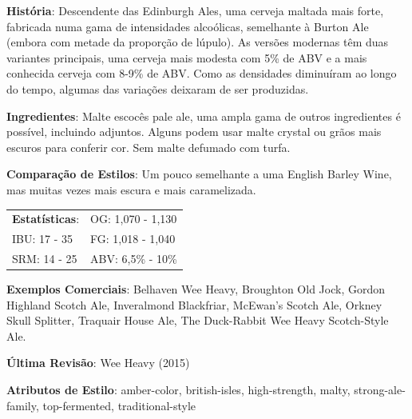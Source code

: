 \textbf{História}: Descendente das Edinburgh Ales, uma cerveja maltada mais forte, fabricada numa gama de intensidades alcoólicas, semelhante à Burton Ale (embora com metade da proporção de lúpulo). As versões modernas têm duas variantes principais, uma cerveja mais modesta com 5\% de ABV e a mais conhecida cerveja com 8-9\% de ABV. Como as densidades diminuíram ao longo do tempo, algumas das variações deixaram de ser produzidas.

\textbf{Ingredientes}: Malte escocês pale ale, uma ampla gama de outros ingredientes é possível, incluindo adjuntos. Alguns podem usar malte crystal ou grãos mais escuros para conferir cor. Sem malte defumado com turfa.

\textbf{Comparação de Estilos}: Um pouco semelhante a uma English Barley Wine, mas muitas vezes mais escura e mais caramelizada.

\begin{tabular}{@{}p{35mm}p{35mm}@{}}
  \textbf{Estatísticas}: & OG: 1,070 - 1,130 \\
  IBU: 17 - 35  & FG: 1,018 - 1,040  \\
  SRM: 14 - 25  & ABV: 6,5\% - 10\%
\end{tabular}

\textbf{Exemplos Comerciais}: Belhaven Wee Heavy, Broughton Old Jock, Gordon Highland Scotch Ale, Inveralmond Blackfriar, McEwan's Scotch Ale, Orkney Skull Splitter, Traquair House Ale, The Duck-Rabbit Wee Heavy Scotch-Style Ale.

\textbf{Última Revisão}: Wee Heavy (2015)

\textbf{Atributos de Estilo}: amber-color, british-isles, high-strength, malty, strong-ale-family, top-fermented, traditional-style
